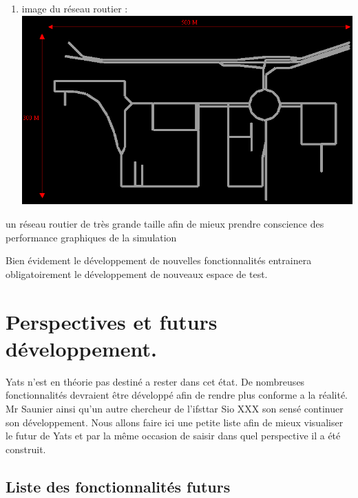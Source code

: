 \documentclass[a4paper,11pt]{article}
\begin{document}
\begin{enumerate}[label=-]
\begin{enumerate}[label=$\square$]
\item image du réseau routier :\\
\includegraphics[scale=0.4]{imgDiverses/bigmap.PNG}
\end{enumerate} %

un réseau routier de très grande taille afin de mieux prendre conscience des performance graphiques de la simulation

\end{enumerate} %

Bien évidement le développement de nouvelles fonctionnalités entrainera obligatoirement le développement de nouveaux espace de test.

\newpage
\section{Perspectives et futurs développement.}


Yats n'est en théorie pas destiné a rester dans cet état. De nombreuses fonctionnalités devraient être développé afin de rendre plus conforme a la réalité. Mr Saunier ainsi qu'un autre chercheur de l'ifsttar Sio XXX son sensé continuer son développement. Nous allons faire ici une petite liste afin de mieux visualiser le futur de Yats et par la même occasion de saisir dans quel perspective il a été construit.

\subsection{Liste des fonctionnalités futurs}
\end{document}

